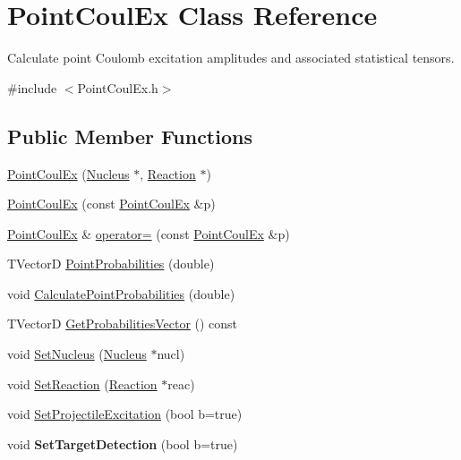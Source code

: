 \hypertarget{classPointCoulEx}{\section{Point\-Coul\-Ex Class Reference}
\label{classPointCoulEx}
}


Calculate point Coulomb excitation amplitudes and associated statistical tensors.  




{\ttfamily \#include $<$Point\-Coul\-Ex.\-h$>$}

\subsection*{Public Member Functions}
\begin{DoxyCompactItemize}
\item 
\hyperlink{classPointCoulEx_a9246400fa6440b3628cdb3010e733f3c}{Point\-Coul\-Ex} (\hyperlink{classNucleus}{Nucleus} $\ast$, \hyperlink{classReaction}{Reaction} $\ast$)
\item 
\hyperlink{classPointCoulEx_ae304214fe53d62d39b1413bf179bd0bd}{Point\-Coul\-Ex} (const \hyperlink{classPointCoulEx}{Point\-Coul\-Ex} \&p)
\item 
\hyperlink{classPointCoulEx}{Point\-Coul\-Ex} \& \hyperlink{classPointCoulEx_ac812c4e40026a7becd63c583b63aaf43}{operator=} (const \hyperlink{classPointCoulEx}{Point\-Coul\-Ex} \&p)
\item 
T\-Vector\-D \hyperlink{classPointCoulEx_ae3636eacee3ab0f37d0b8c927d779387}{Point\-Probabilities} (double)
\item 
void \hyperlink{classPointCoulEx_a350a143e891ac63bb7088559a20081dc}{Calculate\-Point\-Probabilities} (double)
\item 
T\-Vector\-D \hyperlink{classPointCoulEx_a7af998470e383eb70c74c3dae33a85b6}{Get\-Probabilities\-Vector} () const 
\item 
void \hyperlink{classPointCoulEx_a8e109cc21be7be0abb69fb561bab4dcf}{Set\-Nucleus} (\hyperlink{classNucleus}{Nucleus} $\ast$nucl)
\item 
void \hyperlink{classPointCoulEx_a2b3413601d938ca86e6ccf0aa8e09f37}{Set\-Reaction} (\hyperlink{classReaction}{Reaction} $\ast$reac)
\item 
void \hyperlink{classPointCoulEx_aea871d21af150c2ca49c95be891bc717}{Set\-Projectile\-Excitation} (bool b=true)
\item 
\hypertarget{classPointCoulEx_a547911f31b59fb1e3d5bb9492e097422}{void {\bfseries Set\-Target\-Detection} (bool b=true)}\label{classPointCoulEx_a547911f31b59fb1e3d5bb9492e097422}


\end{DoxyCompactItemize}
